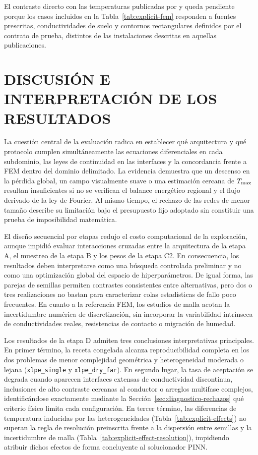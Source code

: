 El contraste directo con las temperaturas publicadas por \textcite{aras2005} y \textcite{kim2025} queda pendiente porque los casos incluidos en la Tabla~\ref{tab:explicit-fem} responden a fuentes prescritas, conductividades de suelo y contornos rectangulares definidos por el contrato de prueba, distintos de las instalaciones descritas en aquellas publicaciones.

\section{DISCUSIÓN E INTERPRETACIÓN DE LOS RESULTADOS}
\label{sec:discusion}

La cuestión central de la evaluación radica en establecer qué arquitectura y qué protocolo cumplen simultáneamente las ecuaciones diferenciales en cada subdominio, las leyes de continuidad en las interfaces y la concordancia frente a FEM dentro del dominio delimitado. La evidencia demuestra que un descenso en la pérdida global, un campo visualmente suave o una estimación cercana de $T_{\max}$ resultan insuficientes si no se verifican el balance energético regional y el flujo derivado de la ley de Fourier. Al mismo tiempo, el rechazo de las redes de menor tamaño describe su limitación bajo el presupuesto fijo adoptado sin constituir una prueba de imposibilidad matemática.

El diseño secuencial por etapas redujo el costo computacional de la exploración, aunque impidió evaluar interacciones cruzadas entre la arquitectura de la etapa A, el muestreo de la etapa B y los pesos de la etapa C2. En consecuencia, los resultados deben interpretarse como una búsqueda controlada preliminar y no como una optimización global del espacio de hiperparámetros. De igual forma, las parejas de semillas permiten contrastes consistentes entre alternativas, pero dos o tres realizaciones no bastan para caracterizar colas estadísticas de fallo poco frecuentes. En cuanto a la referencia FEM, los estudios de malla acotan la incertidumbre numérica de discretización, sin incorporar la variabilidad intrínseca de conductividades reales, resistencias de contacto o migración de humedad.

Los resultados de la etapa D admiten tres conclusiones interpretativas principales. En primer término, la receta congelada alcanza reproducibilidad completa en los dos problemas de menor complejidad geométrica y heterogeneidad moderada o lejana (\texttt{xlpe\_single} y \texttt{xlpe\_dry\_far}). En segundo lugar, la tasa de aceptación se degrada cuando aparecen interfaces extensas de conductividad discontinua, inclusiones de alto contraste cercanas al conductor o arreglos multifase complejos, identificándose exactamente mediante la Sección~\ref{sec:diagnostico-rechazos} qué criterio físico limita cada configuración. En tercer término, las diferencias de temperatura inducidas por las heterogeneidades (Tabla~\ref{tab:explicit-effects}) no superan la regla de resolución preinscrita frente a la dispersión entre semillas y la incertidumbre de malla (Tabla~\ref{tab:explicit-effect-resolution}), impidiendo atribuir dichos efectos de forma concluyente al solucionador PINN.

